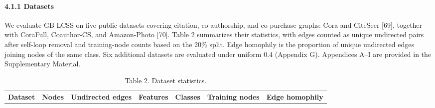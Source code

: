 \paragraph{4.1.1 Datasets}\label{datasets}

We evaluate GB-LCSS on five public datasets covering citation, co-authorship, and co-purchase graphs: Cora and CiteSeer {[}69{]}, together with CoraFull, Coauthor-CS, and Amazon-Photo {[}70{]}. Table 2 summarizes their statistics, with edges counted as unique undirected pairs after self-loop removal and training-node counts based on the 20\% split. Edge homophily is the proportion of unique undirected edges joining nodes of the same class. Six additional datasets are evaluated under uniform 0.4 (Appendix G). Appendices A--I are provided in the Supplementary Material.

\begin{longtable}[]{@{}
  >{\raggedright\arraybackslash}p{}
  >{\centering\arraybackslash}p{}
  >{\centering\arraybackslash}p{}
  >{\centering\arraybackslash}p{}
  >{\centering\arraybackslash}p{}
  >{\centering\arraybackslash}p{}
  >{\centering\arraybackslash}p{}@{}}
\caption{Table 2. Dataset statistics.}\tabularnewline
\toprule\noalign{}
\begin{minipage}[b]{\linewidth}\raggedright
\textbf{Dataset}
\end{minipage} & \begin{minipage}[b]{\linewidth}\centering
\textbf{Nodes}
\end{minipage} & \begin{minipage}[b]{\linewidth}\centering
\textbf{Undirected edges}
\end{minipage} & \begin{minipage}[b]{\linewidth}\centering
\textbf{Features}
\end{minipage} & \begin{minipage}[b]{\linewidth}\centering
\textbf{Classes}
\end{minipage} & \begin{minipage}[b]{\linewidth}\centering
\textbf{Training nodes}
\end{minipage} & \begin{minipage}[b]{\linewidth}\centering
\textbf{Edge homophily}

\end{minipage}
\end{longtable}
